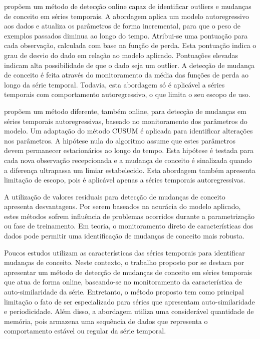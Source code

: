 \documentclass[msc, classic, a4paper]{ufbathesis}
\begin{document}
 propõem um método de detecção online capaz de identificar outliers e mudanças de conceito em séries temporais.
A abordagem aplica um modelo autoregressivo aos dados e atualiza os parâmetros de forma incremental, para que o peso de exemplos passados diminua ao longo do tempo. Atribui-se uma pontuação para cada observação, calculada com base na função de perda. Esta pontuação indica o grau de desvio do dado em relação ao modelo aplicado. Pontuações elevadas indicam alta possibilidade de que o dado seja um outlier. A detecção de mudança de conceito é feita através do monitoramento da média das funções de perda ao longo da série temporal. Todavia, esta abordagem só é aplicável a séries temporais com comportamento autoregressivo, o que limita o seu escopo de uso.

 propõem um método diferente, também online, para detecção de mudanças em séries temporais autoregressivas, baseado no monitoramento dos parâmetros do modelo. Um adaptação do método CUSUM \cite{Page:CUSUM:PageHinkley:1954} é aplicada para identificar alterações nos parâmetros. A hipótese nula do algoritmo assume que estes parâmetros devem permanecer estacionários ao longo do tempo. Esta hipótese é testada para cada nova observação recepcionada e a mudança de conceito é sinalizada quando a diferença ultrapassa um limiar estabelecido. Esta abordagem também apresenta limitação de escopo, pois é aplicável apenas a séries temporais autoregressivas.

A utilização de valores residuais para detecção de mudanças de conceito  apresenta desvantagens. Por serem baseados na acurácia do modelo aplicado, estes métodos sofrem influência de problemas ocorridos durante a parametrização ou fase de treinamento. Em teoria, o monitoramento direto de características dos dados pode permitir uma identificação de mudanças de conceito mais robusta.

Poucos estudos utilizam as características das séries temporais para identificar mudanças de conceito. Neste contexto, o trabalho proposto por   se destaca por apresentar um método de detecção de mudanças de conceito em séries temporais que atua de forma online, baseando-se no monitoramento da característica de auto-similaridade da série.
Entretanto, o método proposto tem como principal limitação o fato de ser especializado para séries que apresentam auto-similaridade e periodicidade. Além disso, a abordagem utiliza uma considerável quantidade de memória, pois armazena uma sequência de dados que representa o comportamento estável ou regular da série temporal.
\end{document}
